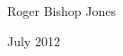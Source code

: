 \vspace{0.2in}

Roger Bishop Jones

July 2012

\mainmatter

\renewcommand{\aref}{Volume \Roman{chapter} Book \Roman{section} Part \arabic{subsection}}



\backmatter

%
%




\renewcommand{\aref}{}
\renewcommand{\volumename}{}
\renewcommand{\chaptermark}[1]{}
\renewcommand{\sectionmark}[1]{}

\printindex

\vfil



